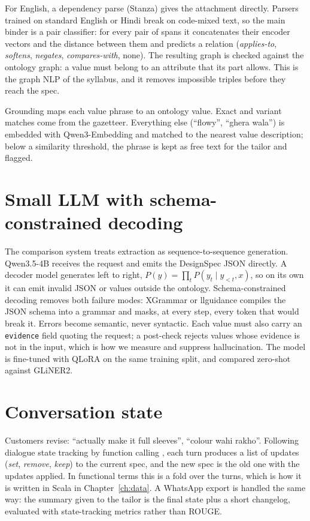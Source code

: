 For English, a dependency parse (Stanza) gives the attachment directly. Parsers trained on standard English or Hindi break on code-mixed text, so the main binder is a pair classifier: for every pair of spans it concatenates their encoder vectors and the distance between them and predicts a relation (\emph{applies-to}, \emph{softens}, \emph{negates}, \emph{compares-with}, none). The resulting graph is checked against the ontology graph: a value must belong to an attribute that its part allows. This is the graph NLP of the syllabus, and it removes impossible triples before they reach the spec.

Grounding maps each value phrase to an ontology value. Exact and variant matches come from the gazetteer. Everything else (``flowy'', ``ghera wala'') is embedded with Qwen3-Embedding and matched to the nearest value description; below a similarity threshold, the phrase is kept as free text for the tailor and flagged.

\section{Small LLM with schema-constrained decoding}

The comparison system treats extraction as sequence-to-sequence generation. Qwen3.5-4B receives the request and emits the DesignSpec JSON directly. A decoder model generates left to right, $P(y)=\prod_t P(y_t\mid y_{<t},x)$, so on its own it can emit invalid JSON or values outside the ontology. Schema-constrained decoding removes both failure modes: XGrammar \cite{dong2025xgrammar} or llguidance compiles the JSON schema into a grammar and masks, at every step, every token that would break it. Errors become semantic, never syntactic. Each value must also carry an \texttt{evidence} field quoting the request; a post-check rejects values whose evidence is not in the input, which is how we measure and suppress hallucination. The model is fine-tuned with QLoRA on the same training split, and compared zero-shot against GLiNER2.

\section{Conversation state}

Customers revise: ``actually make it full sleeves'', ``colour wahi rakho''. Following dialogue state tracking by function calling \cite{li2024fnctod}, each turn produces a list of updates (\emph{set}, \emph{remove}, \emph{keep}) to the current spec, and the new spec is the old one with the updates applied. In functional terms this is a fold over the turns, which is how it is written in Scala in Chapter~\ref{ch:data}. A WhatsApp export is handled the same way: the summary given to the tailor is the final state plus a short changelog, evaluated with state-tracking metrics rather than ROUGE.

